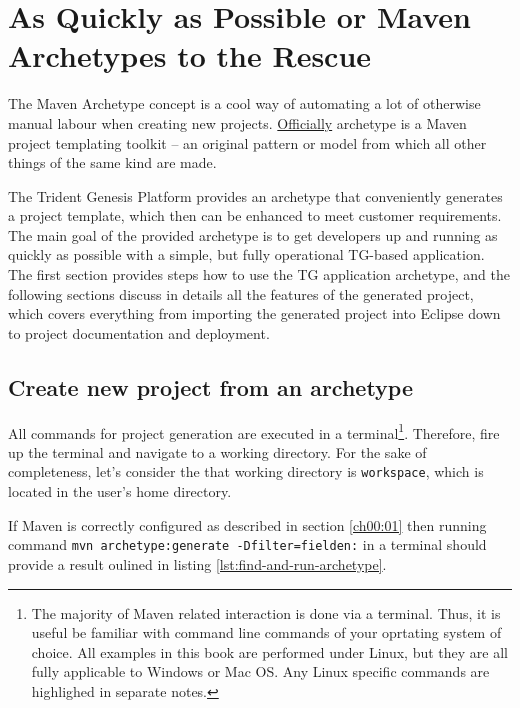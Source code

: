 \chapter{As Quickly as Possible or Maven Archetypes to the Rescue}\label{ch00:02}

The Maven Archetype concept is a cool way of automating a lot of otherwise manual labour when creating new projects.
  \href{http://maven.apache.org/guides/introduction/introduction-to-archetypes.html}{Officially} archetype is a Maven project templating toolkit -- an original pattern or model from which all other things of the same kind are made.

  The Trident Genesis Platform provides an archetype that conveniently generates a project template, which then can be enhanced to meet customer requirements.
  The main goal of the provided archetype is to get developers up and running as quickly as possible with a simple, but fully operational TG-based application.
  The first section provides steps how to use the TG application archetype, and the following sections discuss in details all the features of the generated project, which covers everything from importing the generated project into Eclipse down to project documentation and deployment.

\section{Create new project from an archetype}

  All commands for project generation are executed in a terminal\footnote{The majority of Maven related interaction is done via a terminal.
  Thus, it is useful be familiar with command line commands of your oprtating system of choice.
  All examples in this book are performed under Linux, but they are all fully applicable to Windows or Mac OS.
  Any Linux specific commands are highlighed in separate notes.}.
  Therefore, fire up the terminal and navigate to a working directory.
  For the sake of completeness, let's consider the that working directory is \texttt{workspace}, which is located in the user's home directory.
  
  If Maven is correctly configured as described in section \ref{ch00:01} then running command \texttt{mvn archetype:generate -Dfilter=fielden:} in a terminal should provide a result oulined in listing \ref{lst:find-and-run-archetype}.

